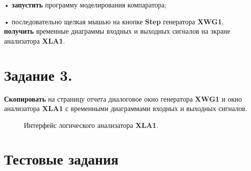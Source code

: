\documentclass[bachelor, och, otchet, hidelinks]{SCWorks}
\begin{document}
\par • \textbf{запустить} программу моделирования компаратора;

\par • последовательно щелкая мышью на кнопке \textbf{Step} генератора \textbf{XWG1}, \textbf{получить} 
временные диаграммы входных и выходных сигналов на экране анализатора \textbf{XLA1}.

\newpage

\section*{Задание 3.}

\textbf{Скопировать} на страницу отчета диалоговое окно генератора \textbf{XWG1} и окно анализатора 
\textbf{XLA1} с временными диаграммами входных и выходных сигналов.

\begin{figure}[h]
	\caption{Интерфейс логического анализатора \textbf{XLA1}.}
\end{figure}

\newpage

\section*{Тестовые задания}
\end{document}
